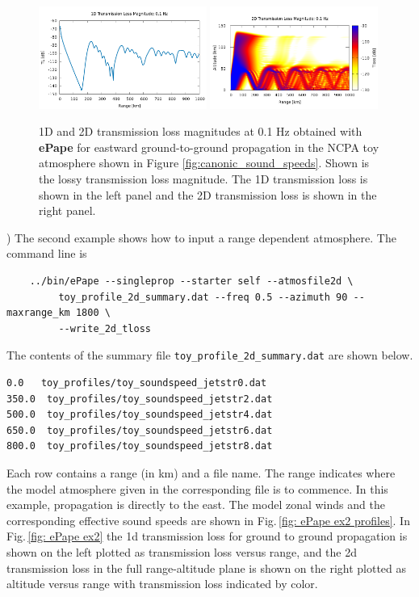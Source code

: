 \begin{figure}[h]
\begin{center}
\includegraphics[width=0.49\textwidth]{figs/ePape_ex1_1d}
\includegraphics[width=0.49\textwidth]{figs/ePape_ex1_2d}
\end{center}
\caption{1D and 2D transmission loss magnitudes at 0.1 Hz obtained with {\bf ePape} for eastward ground-to-ground propagation in the NCPA toy atmosphere shown in Figure \ref{fig:canonic_sound_speeds}. Shown is the lossy transmission loss magnitude. The 1D transmission loss is shown in the left panel and the 2D transmission loss is shown in the right panel.}
\label{fig: ePape ex1}
\end{figure}

) The second example shows how to input a range dependent atmosphere. The command line is 
\begin{verbatim}
    ../bin/ePape --singleprop --starter self --atmosfile2d \
         toy_profile_2d_summary.dat --freq 0.5 --azimuth 90 --maxrange_km 1800 \
         --write_2d_tloss
\end{verbatim}
The contents of the summary file \verb+toy_profile_2d_summary.dat+ are shown below. 
\begin{verbatim}
0.0   toy_profiles/toy_soundspeed_jetstr0.dat
350.0  toy_profiles/toy_soundspeed_jetstr2.dat
500.0  toy_profiles/toy_soundspeed_jetstr4.dat
650.0  toy_profiles/toy_soundspeed_jetstr6.dat
800.0  toy_profiles/toy_soundspeed_jetstr8.dat
\end{verbatim}
Each row contains a range (in km) and a file name. The range indicates where the model atmosphere given in the corresponding file is to commence. In this example, propagation is directly to the east. The model zonal winds and the corresponding effective sound speeds are shown in Fig.\,\ref{fig: ePape ex2 profiles}. In Fig.\,\ref{fig: ePape ex2} the 1d transmission loss for ground to ground propagation is shown on the left plotted as transmission loss versus range, and the 2d transmission loss in the full range-altitude plane is shown on the right plotted as altitude versus range with transmission loss indicated by color. 

